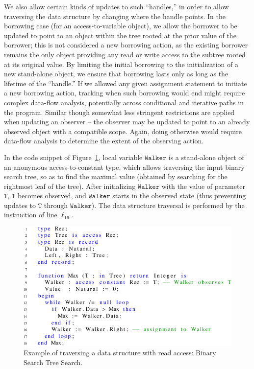 \documentclass{llncs}
\newcommand\var[1]{\ensuremath{\mathtt{#1}}}
\begin{document}
We also allow certain kinds of updates to such ``handles,'' in order to allow traversing the data structure by changing where the handle points.
In the borrowing case (for an access-to-variable object), we allow the borrower to be updated to point to an object within the tree rooted at the prior value of the borrower; this is not considered a new borrowing action, as the existing borrower remains the only object providing any read or write access to the subtree rooted at its original value.
By limiting the initial borrowing to the initialization of a new stand-alone object, we ensure that borrowing lasts only as long as the lifetime of the ``handle.''  If we allowed any given assignment statement to initiate a new borrowing action, tracking when such borrowing would end might require complex data-flow analysis, potentially across conditional and iterative paths in the program.  Similar though somewhat less stringent restrictions are applied when updating an observer -- the observer may be updated to point to an already observed object with a compatible scope. Again, doing otherwise would require data-flow analysis to determine the extent of the observing action.

In the code snippet of Figure~\ref{fig:maxTree}, local variable \var{Walker} is a stand-alone object of an anonymous access-to-constant type, which allows traversing the input binary
search tree, so as to find the maximal value (obtained by searching for the rightmost leaf of the tree). After initializing \var{Walker} with the value of parameter \var{T},
\var{T} becomes observed, and \var{Walker} starts in the observed state (thus preventing updates to \var{T} through \var{Walker}). The data structure traversal is performed by the instruction
of line $\ell_{16}$. 

\begin{figure}[htb!]
\centering
  \captionsetup{justification=centering,margin=0.6cm}
   \includegraphics[]{maxTree}
   \caption{Example of traversing a data structure with read access: Binary Search Tree Search.}
   \label{fig:maxTree}
\end{figure}
\end{document}
